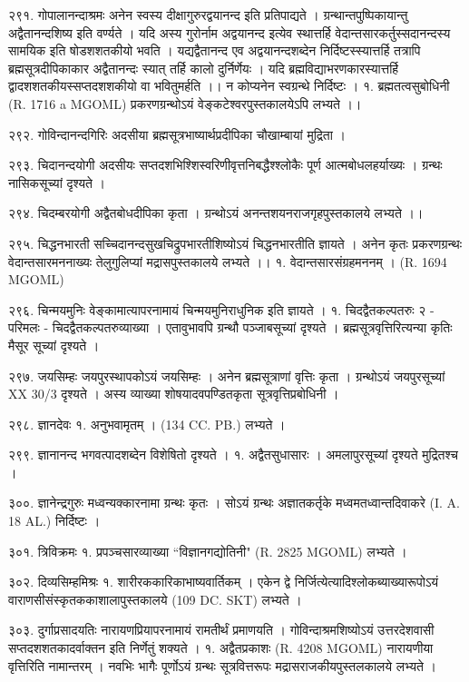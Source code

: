 २९१. गोपालानन्दाश्रमः
अनेन स्वस्य दीक्षागुरुरद्वयानन्द इति प्रतिपाद्यते । ग्रन्थान्तपुष्पिकायान्तु अद्वैतानन्दशिष्य इति वर्ण्यते । यदि अस्य गुरोर्नाम अद्वयानन्द इत्येव स्थात्तर्हि वेदान्तसारकर्तुस्सदानन्दस्य सामयिक इति षोडशशतकीयो भवति । यद्यद्वैतानन्द एव अद्वयानन्दशब्देन निर्दिष्टस्स्यात्तर्हि तत्रापि ब्रह्मसूत्रदीपिकाकार अद्वैतानन्दः स्यात् तर्हि कालो दुर्निर्णेयः । यदि ब्रह्मविद्याभरणकारस्यात्तर्हि द्वादशशतकीयस्सप्तदशशकीयो वा भवितुमर्हति ।। न कोप्यनेन स्वग्रन्थे निर्दिष्टः ।
१. ब्रह्मतत्वसुबोधिनी (R. 1716 a MGOML) प्रकरणग्रन्थोऽयं वेङ्कटेश्वरपुस्तकालयेऽपि लभ्यते ।।

२९२. गोविन्दानन्दगिरिः
अदसीया ब्रह्मसूत्रभाष्यार्थप्रदीपिका चौखाम्बायां मुद्रिता ।

२९३. चिदानन्दयोगी
अदसीयः सप्तदशभिश्शिस्वरिणीवृत्तनिबद्धैश्श्लोकैः पूर्ण आत्मबोधलहर्याख्यः । ग्रन्थः नासिकसूच्यां दृश्यते ।

२९४. चिदम्बरयोगी
अद्वैतबोधदीपिका कृता । ग्रन्थोऽयं अनन्तशयनराजगृहपुस्तकालये लभ्यते ।।

२९५. चिद्धनभारती 
सच्चिदानन्दसुखचिद्रुपभारतीशिष्योऽयं चिद्धनभारतीति ज्ञायते । अनेन कृतः प्रकरणग्रन्थः वेदान्तसारमननाख्यः तेलुगुलिप्यां मद्रासपुस्तकालये लभ्यते ।।
१. वेदान्तसारसंग्रहमननम् । (R. 1694 MGOML)

२९६. चिन्मयमुनिः 
वेङ्कामात्यापरनामायं चिन्मयमुनिराधुनिक इति ज्ञायते ।
१. चिदद्वैतकल्पतरुः २ - परिमलः - चिदद्वैतकल्पतरुव्याख्या । एतावुभावपि ग्रन्थौ पञ्जाबसूच्यां दृश्यते । ब्रह्मसूत्रवृत्तिरित्यन्या कृतिः मैसूर सूच्यां दृश्यते ।

२९७. जयसिम्हः 
जयपुरस्थापकोऽयं जयसिम्हः । अनेन ब्रह्मसूत्राणां वृत्तिः कृता । ग्रन्थोऽयं जयपुरसूच्यां XX 30/3 दृश्यते । अस्य व्याख्या शोषयादवपण्डितकृता सूत्रवृत्तिप्रबोधिनी ।

२९८. ज्ञानदेवः
१. अनुभवामृतम् । (134 CC. PB.) लभ्यते ।

२९९. ज्ञानानन्द
भगवत्पादशब्देन विशेषितो दृश्यते ।
१. अद्वैतसुधासारः । अमलापुरसूच्यां दृश्यते मुद्रितश्च ।

३००. ज्ञानेन्द्रगुरुः
मध्वन्यक्कारनामा ग्रन्थः कृतः । सोऽयं ग्रन्थः अज्ञातकर्तृके मध्वमतध्वान्तदिवाकरे (I. A. 18 AL.) निर्दिष्टः ।

३०१. त्रिविक्रमः
१. प्रपञ्चसारव्याख्या ``विज्ञानगद्योतिनी" (R. 2825 MGOML) लभ्यते ।

३०२. दिव्यसिम्हमिश्रः
१. शारीरककारिकाभाष्यवार्तिकम् । एकेन द्वे निर्जित्येत्यादिश्लोकब्याख्यारूपोऽयं वाराणसीसंस्कृतककाशालापुस्तकालये (109 DC. SKT) लभ्यते ।

३०३. दुर्गाप्रसादयतिः
नारायणप्रियापरनामायं रामतीर्थं प्रमाणयति । गोविन्दाश्रमशिष्योऽयं उत्तरदेशवासी सप्तदशशतकादर्वाक्तन इति निर्णेतुं शक्यते ।
१. अद्वैतप्रकाशः (R. 4208 MGOML)
नारायणीया वृत्तिरिति नामान्तरम् । नवभिः भागैः पूर्णोऽयं ग्रन्थः सूत्रवित्तरूपः मद्रासराजकीयपुस्तलकालये लभ्यते ।

